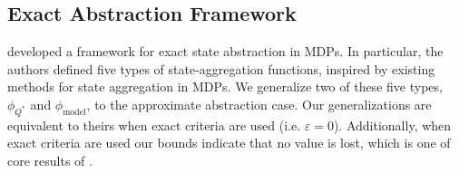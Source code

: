 \subsection{Exact Abstraction Framework}

\citet{li2006towards} developed a framework for exact state abstraction in \acp{MDP}. In particular, the authors defined five types of state-aggregation functions, inspired by existing methods for state aggregation in \acp{MDP}. We generalize two of these five types, $\phi_{Q^*}$ and $\phi_{\text{model}}$, to the approximate abstraction case. Our generalizations are equivalent to theirs when exact criteria are used (i.e. $\varepsilon = 0$). Additionally, when exact criteria are used our bounds indicate that no value is lost, which is one of core results of \citet{li2006towards}.

